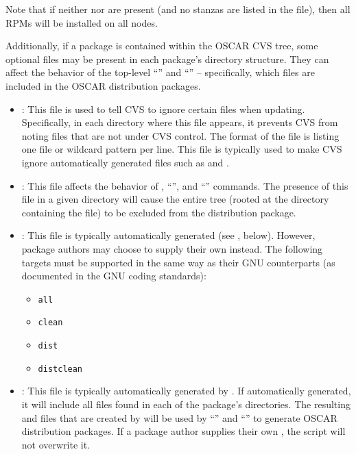 Note that if neither  nor 
are present (and no  stanzas are listed in the
 file), then all RPMs will be installed on all nodes.

\endchange

Additionally, if a package is contained within the OSCAR CVS tree,
some optional files may be present in each package's directory
structure.  They can affect the behavior of the top-level ``'' and ``'' -- specifically, which files
are included in the OSCAR distribution packages.

\begin{itemize}
\item {}: This file is used to tell CVS to ignore
  certain files when updating.  Specifically, in each directory where
  this file appears, it prevents CVS from noting files that are not
  under CVS control.  The format of the file is listing one file or
  wildcard pattern per line.  This file is typically used to make CVS
  ignore automatically generated files such as  and
  .
  
\item {}: This file affects the behavior of
  , ``'', and ``''
  commands.  The presence of this file in a given directory will cause
  the entire tree (rooted at the directory containing the
   file) to be excluded from the distribution
  package.
  
\item {}: This file is typically automatically generated
  (see , below).  However, package authors may
  choose to supply their own  instead.  The following
  targets must be supported in the same way as their GNU
   counterparts (as documented in the GNU coding
  standards):

  \begin{itemize}
  \item {\tt all}
  \item {\tt clean}
  \item {\tt dist}
  \item {\tt distclean}
  \end{itemize}
  
\item {}: This file is typically automatically
  generated by .  If automatically generated, it will
  include all files found in each of the package's directories.  The
  resulting  and  files that are
  created by  will be used by ``'' and
  ``'' to generate OSCAR distribution packages.
  If a package author supplies their own , the
   script will not overwrite it.
\end{itemize}

